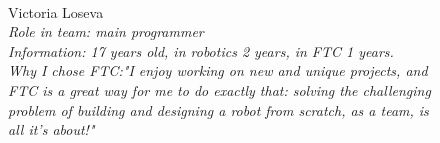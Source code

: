 \begin{figure}[H]	
	\begin{minipage}[h]{0.47\linewidth}
		\\
	\end{minipage}
	\hfill
	\begin{minipage}{0.47\linewidth}
		Victoria Loseva\\
		\emph{Role in team: main programmer\\ }
		\emph{Information: 17 years old, in robotics 2 years, in FTC 1 years. \\} 
		\emph{Why I chose FTC:"I enjoy working on new and unique projects, and FTC is a great way for me to do exactly that: solving the challenging problem of building and designing a robot from scratch, as a team, is all it's about!"}			
	\end{minipage}	
\end{figure}

\fillpage



